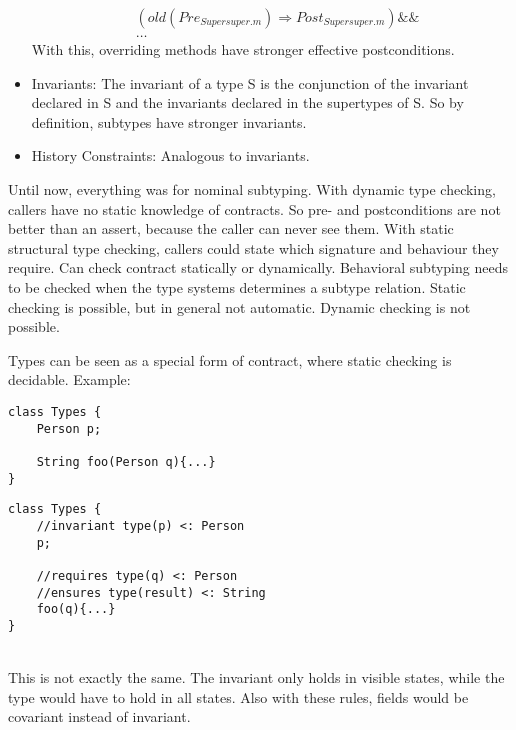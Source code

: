 \begin{mytitle}
\begin{itemize}
\begin{equation*}
\begin{split}
        & (old(Pre_{Supersuper.m}) \Rightarrow Post_{Supersuper.m}) \&\& \\
        & \hdots 
        \end{split}
    \end{equation*}
    With this, overriding methods have stronger effective postconditions.
    \item Invariants: The invariant of a type S is the conjunction of the invariant declared in S and the invariants declared in the supertypes of S. So by definition, subtypes have stronger invariants. 
    \item History Constraints: Analogous to invariants.
\end{itemize}
\end{mytitle}
\begin{mytitle} Until now, everything was for nominal subtyping. With dynamic type checking, callers have no static knowledge of contracts. So pre- and postconditions are not better than an assert, because the caller can never see them. With static structural type checking, callers could state which signature and behaviour they require. Can check contract statically or dynamically. Behavioral subtyping needs to be checked when the type systems determines a subtype relation. Static checking is possible, but in general not automatic. Dynamic checking is not possible.
\end{mytitle}
\begin{mytitle} Types can be seen as a special form of contract, where static checking is decidable. Example:\\
\lstset{language=Java}
\begin{minipage}[t]{0.5\textwidth}
    \begin{lstlisting}
class Types {
    Person p;
            
    String foo(Person q){...}
}
    \end{lstlisting}
\end{minipage}
\begin{minipage}[t]{0.5\textwidth}
    \begin{lstlisting}
class Types {
    //invariant type(p) <: Person
    p;
    
    //requires type(q) <: Person
    //ensures type(result) <: String
    foo(q){...}
}
    \end{lstlisting}
\end{minipage}\hfill\\[0.5em]
This is not exactly the same. The invariant only holds in visible states, while the type would have to hold in all states. Also with these rules, fields would be covariant instead of invariant.
\end{mytitle}
